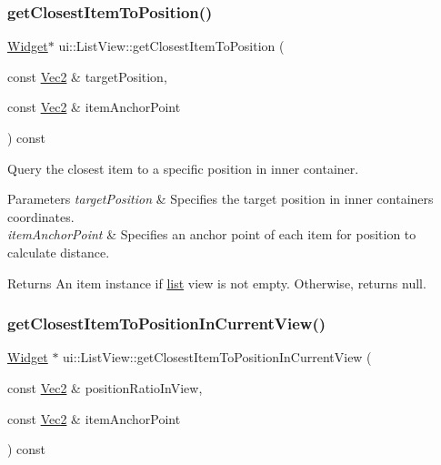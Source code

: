 \subsubsection{\texorpdfstring{get\+Closest\+Item\+To\+Position()}{getClosestItemToPosition()}\hspace{0.1cm}{\footnotesize\ttfamily [2/2]}}
{\footnotesize\ttfamily \hyperlink{classui_1_1Widget}{Widget}$\ast$ ui\+::\+List\+View\+::get\+Closest\+Item\+To\+Position (\begin{DoxyParamCaption}\item[{const \hyperlink{classVec2}{Vec2} \&}]{target\+Position,  }\item[{const \hyperlink{classVec2}{Vec2} \&}]{item\+Anchor\+Point }\end{DoxyParamCaption}) const}



Query the closest item to a specific position in inner container. 


\begin{DoxyParams}{Parameters}
{\em target\+Position} & Specifies the target position in inner container\textquotesingle{}s coordinates. \\
\hline
{\em item\+Anchor\+Point} & Specifies an anchor point of each item for position to calculate distance. \\
\hline
\end{DoxyParams}
\begin{DoxyReturn}{Returns}
An item instance if \hyperlink{protocollist-p}{list} view is not empty. Otherwise, returns null. 
\end{DoxyReturn}
\mbox{\label{classui_1_1ListView_a0d21477a14d78ef1d1355bf0ab02fb80}} 
\subsubsection{\texorpdfstring{get\+Closest\+Item\+To\+Position\+In\+Current\+View()}{getClosestItemToPositionInCurrentView()}\hspace{0.1cm}{\footnotesize\ttfamily [1/2]}}
{\footnotesize\ttfamily \hyperlink{classui_1_1Widget}{Widget} $\ast$ ui\+::\+List\+View\+::get\+Closest\+Item\+To\+Position\+In\+Current\+View (\begin{DoxyParamCaption}\item[{const \hyperlink{classVec2}{Vec2} \&}]{position\+Ratio\+In\+View,  }\item[{const \hyperlink{classVec2}{Vec2} \&}]{item\+Anchor\+Point }\end{DoxyParamCaption}) const}



